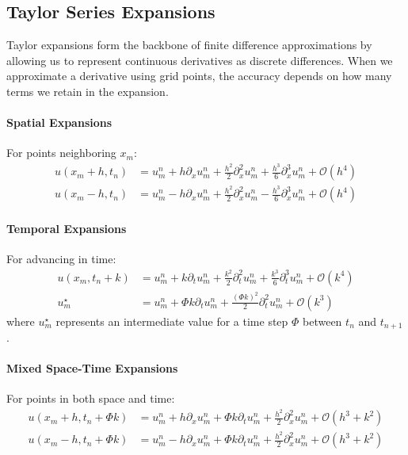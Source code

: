 \subsection{Taylor Series Expansions}\label{sec:taylor_expansions}

Taylor expansions form the backbone of finite difference approximations by allowing us to represent continuous derivatives as discrete differences. When we approximate a derivative using grid points, the accuracy depends on how many terms we retain in the expansion.

\paragraph{Spatial Expansions}
For points neighboring $x_m$:
\begin{align}
  u(x_m + h, t_n) & = u_m^n + h \partial_x u_m^n + \frac{h^2}{2} \partial_x^2 u_m^n + \frac{h^3}{6} \partial_x^3 u_m^n + \mathcal{O}(h^4) \tag{T1} \label{eq:taylor_forward}  \\
  u(x_m - h, t_n) & = u_m^n - h \partial_x u_m^n + \frac{h^2}{2} \partial_x^2 u_m^n - \frac{h^3}{6} \partial_x^3 u_m^n + \mathcal{O}(h^4) \tag{T2} \label{eq:taylor_backward}
\end{align}

\paragraph{Temporal Expansions}
For advancing in time:
\begin{align}
  u(x_m, t_n + k) & = u_m^n + k \partial_t u_m^n + \frac{k^2}{2} \partial_t^2 u_m^n + \frac{k^3}{6} \partial_t^3 u_m^n + \mathcal{O}(k^4) \tag{T3} \label{eq:taylor_time} \\
  u_m^\star       & = u_m^n + \Phi k \partial_t u_m^n + \frac{(\Phi k)^2}{2} \partial_t^2 u_m^n + \mathcal{O}(k^3) \tag{T4} \label{eq:taylor_intermediate}
\end{align}
where $u_m^\star$ represents an intermediate value for a time step $\Phi$ between $t_n$ and $t_{n+1}$.

\paragraph{Mixed Space-Time Expansions}
For points in both space and time:
\begin{align}
  u(x_m + h, t_n + \Phi k) & = u_m^n + h \partial_x u_m^n + \Phi k \partial_t u_m^n + \frac{h^2}{2}\partial_x^2 u_m^n + \mathcal{O}(h^3 + k^2) \tag{T5} \label{eq:taylor_mixed_forward}  \\
  u(x_m - h, t_n + \Phi k) & = u_m^n - h \partial_x u_m^n + \Phi k \partial_t u_m^n + \frac{h^2}{2}\partial_x^2 u_m^n + \mathcal{O}(h^3 + k^2) \tag{T6} \label{eq:taylor_mixed_backward}
\end{align}

